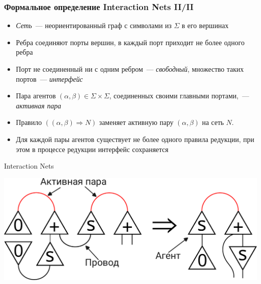 \documentclass
  [ russian
  , aspectratio=169 %
  ] {beamer}
\begin{document}
\begin{frame}
    \frametitle{Формальное определение Interaction Nets II/II}

    \begin{itemize}
        \item \textit{Сеть}~--- неориентированный граф с символами из $\Sigma$ в его вершинах
        \item Ребра соединяют порты вершин, в каждый порт приходит не более одного ребра
        \item Порт не соединенный ни с одним ребром~--- \textit{свободный}, множество таких портов~--- \textit{интерфейс}
        \item Пара агентов $(\alpha, \beta) \in \Sigma \times \Sigma$, соединенных своими главными портами,~--- \textit{активная пара}
        \item Правило $((\alpha, \beta) \Longrightarrow N)$ заменяет активную пару $(\alpha, \beta)$ на сеть $N$.
        \item Для каждой пары агентов существует не более одного правила редукции, при этом в процессе редукции интерфейс сохраняется
    \end{itemize}

\end{frame}

\begin{frame}{Interaction Nets}

    \begin{center}
        \includegraphics[width=\textwidth]{figures/in_talk.pdf}
    \end{center}

\end{frame}
\end{document}
